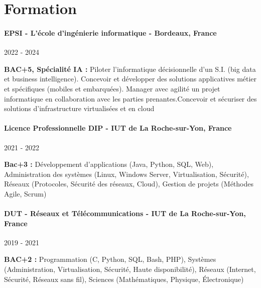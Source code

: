 \documentclass{article}
\begin{document}
\vspace{2ex}
\hrulefill
\section*{Formation}
\paragraph{EPSI - L'école d'ingénierie informatique - Bordeaux, France }\hspace*{\fill}2022 - 2024
\vspace{\baselineskip}

\textbf{BAC+5, Spécialité IA :} Piloter l’informatique décisionnelle d’un S.I. (big data et business intelligence). Concevoir et développer des solutions applicatives métier et spécifiques (mobiles et embarquées). Manager avec agilité un projet informatique en collaboration avec les parties prenantes.Concevoir et sécuriser des solutions d’infrastructure virtualisées et en cloud


\paragraph{Licence Professionnelle DIP - IUT de La Roche-sur-Yon, France }\hspace*{\fill}2021 - 2022
\vspace{\baselineskip}

\textbf{Bac+3 :} Développement d'applications (Java, Python, SQL, Web), Administration des systèmes (Linux, Windows Server, Virtualisation, Sécurité), Réseaux (Protocoles, Sécurité des réseaux, Cloud), Gestion de projets (Méthodes Agile, Scrum)

\paragraph{DUT - Réseaux et Télécommunications - IUT de La Roche-sur-Yon, France }\hspace*{\fill}2019 - 2021
\vspace{\baselineskip}

\textbf{BAC+2 :} Programmation (C, Python, SQL, Bash, PHP), Systèmes (Administration, Virtualisation, Sécurité, Haute disponibilité), Réseaux (Internet, Sécurité, Réseaux sans fil), Sciences (Mathématiques, Physique, Électronique)
\end{document}
